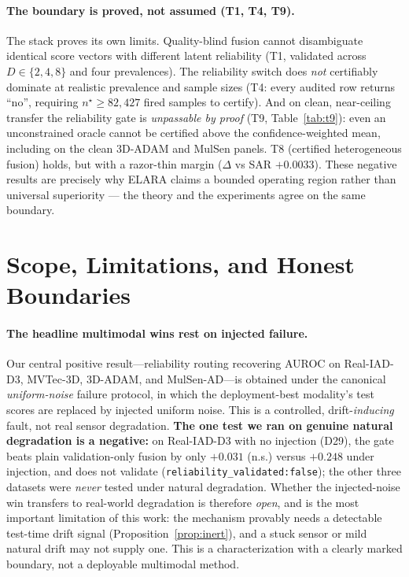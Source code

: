 \documentclass[10pt,conference]{IEEEtran}
\newcommand{\systemu}{ELARA}
\begin{document}
\paragraph{The boundary is proved, not assumed (T1, T4, T9).} The stack proves its own
limits. Quality-blind fusion cannot disambiguate identical score vectors with different
latent reliability (T1, validated across $D\in\{2,4,8\}$ and four prevalences). The
reliability switch does \emph{not} certifiably dominate at realistic prevalence and
sample sizes (T4: every audited row returns ``no'', requiring $n^\star\!\ge\!82{,}427$
fired samples to certify). And on clean, near-ceiling transfer the reliability gate is
\emph{unpassable by proof} (T9, Table~\ref{tab:t9}): even an unconstrained oracle cannot
be certified above the confidence-weighted mean, including on the clean 3D-ADAM and
MulSen panels. T8 (certified heterogeneous fusion) holds, but with a razor-thin margin
($\Delta$ vs SAR $+0.0033$). These negative results are precisely why \systemu{} claims a
bounded operating region rather than universal superiority --- the theory and the
experiments agree on the same boundary.

\begin{table}[t]\centering
\caption{T9 clean-transfer ceiling: $\varepsilon_{\mathrm{subopt}}<$ MDE makes Gate~E
\emph{unpassable by proof} --- no fusion class, oracle included, is certifiable above the
confidence-weighted mean on clean near-ceiling data.}
\label{tab:t9}\footnotesize

\end{table}

\section{Scope, Limitations, and Honest Boundaries}
\paragraph{The headline multimodal wins rest on injected failure.} Our central
positive result---reliability routing recovering AUROC on Real-IAD-D3, MVTec-3D,
3D-ADAM, and MulSen-AD---is obtained under the canonical \emph{uniform-noise} failure
protocol, in which the deployment-best modality's test scores are replaced by
injected uniform noise. This is a controlled, drift-\emph{inducing} fault, not real
sensor degradation. \textbf{The one test we ran on genuine natural degradation is a
negative:} on Real-IAD-D3 with no injection (D29), the gate beats plain
validation-only fusion by only $+0.031$ (n.s.) versus $+0.248$ under injection, and
does not validate (\texttt{reliability\_validated:false}); the other three datasets
were \emph{never} tested under natural degradation. Whether the injected-noise win
transfers to real-world degradation is therefore \emph{open}, and is the most
important limitation of this work: the mechanism provably needs a detectable
test-time drift signal (Proposition~\ref{prop:inert}), and a stuck sensor or mild
natural drift may not supply one. This is a characterization with a clearly marked
boundary, not a deployable multimodal method.
\end{document}
